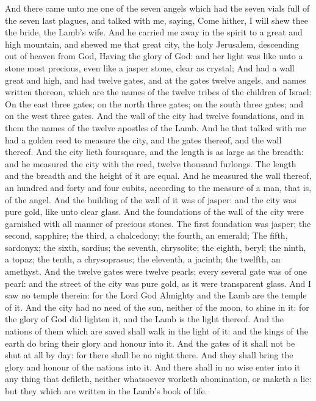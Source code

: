  And there came unto me one of the seven angels which had
the seven vials full of the seven last plagues, and talked with me,
saying, Come hither, I will shew thee the bride, the Lamb's wife.
 And he carried me away in the spirit to a great and high
mountain, and shewed me that great city, the holy Jerusalem, descending
out of heaven from God,  Having the glory of God: and her
light was like unto a stone most precious, even like a jasper stone,
clear as crystal;  And had a wall great and high, and had
twelve gates, and at the gates twelve angels, and names written thereon,
which are the names of the twelve tribes of the children of Israel:
 On the east three gates; on the north three gates; on the
south three gates; and on the west three gates.  And the
wall of the city had twelve foundations, and in them the names of the
twelve apostles of the Lamb.  And he that talked with me
had a golden reed to measure the city, and the gates thereof, and the
wall thereof.  And the city lieth foursquare, and the
length is as large as the breadth: and he measured the city with the
reed, twelve thousand furlongs. The length and the breadth and the
height of it are equal.  And he measured the wall thereof,
an hundred and forty and four cubits, according to the measure of a man,
that is, of the angel.  And the building of the wall of it
was of jasper: and the city was pure gold, like unto clear glass.
 And the foundations of the wall of the city were garnished
with all manner of precious stones. The first foundation was jasper; the
second, sapphire; the third, a chalcedony; the fourth, an emerald;
 The fifth, sardonyx; the sixth, sardius; the seventh,
chrysolite; the eighth, beryl; the ninth, a topaz; the tenth, a
chrysoprasus; the eleventh, a jacinth; the twelfth, an amethyst.
 And the twelve gates were twelve pearls; every several
gate was of one pearl: and the street of the city was pure gold, as it
were transparent glass.  And I saw no temple therein: for
the Lord God Almighty and the Lamb are the temple of it. 
And the city had no need of the sun, neither of the moon, to shine in
it: for the glory of God did lighten it, and the Lamb is the light
thereof.  And the nations of them which are saved shall
walk in the light of it: and the kings of the earth do bring their glory
and honour into it.  And the gates of it shall not be shut
at all by day: for there shall be no night there.  And they
shall bring the glory and honour of the nations into it. 
And there shall in no wise enter into it any thing that defileth,
neither whatsoever worketh abomination, or maketh a lie: but they which
are written in the Lamb's book of life.

